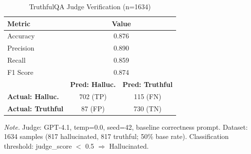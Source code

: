 \begin{table}[H]
\centering
\small
\setlength{\tabcolsep}{3.5pt}
\begin{threeparttable}
\caption{TruthfulQA Judge Verification (n=1634)}
\label{tab:truthqa_verification}
\begin{tabular}{lcc}
\toprule
\textbf{Metric} & \multicolumn{2}{c}{\textbf{Value}} \\
\midrule
Accuracy & \multicolumn{2}{c}{0.876} \\
Precision & \multicolumn{2}{c}{0.890} \\
Recall & \multicolumn{2}{c}{0.859} \\
F1 Score & \multicolumn{2}{c}{0.874} \\
\midrule
 & \textbf{Pred: Halluc.} & \textbf{Pred: Truthful} \\
\textbf{Actual: Halluc.} & 702 (TP) & 115 (FN) \\
\textbf{Actual: Truthful} & 87 (FP) & 730 (TN) \\
\bottomrule
\end{tabular}
\begin{tablenotes}
\footnotesize
\item \textit{Note.} Judge: GPT-4.1, temp=0.0, seed=42, baseline correctness prompt. Dataset: 1634 samples (817 hallucinated, 817 truthful; 50\% base rate). Classification threshold: judge\_score $<$ 0.5 $\Rightarrow$ Hallucinated.
\end{tablenotes}
\end{threeparttable}
\end{table}
